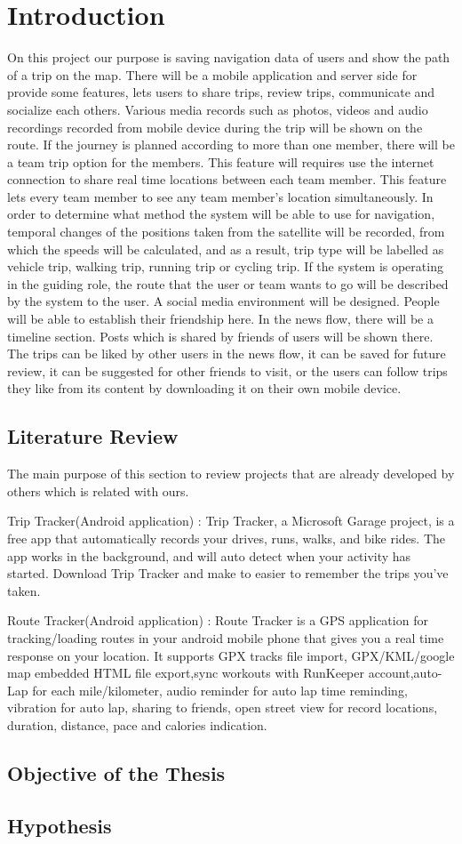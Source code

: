 \chapter{Introduction}
On this project our purpose is saving navigation data of users and show the path of a trip on the map. There will be a mobile application and server side for provide some features, lets users to share trips, review trips, communicate and socialize each others. Various media records such as photos, videos and audio recordings recorded from mobile device during the trip will be shown on the route. If the journey is planned according to more than one member, there will be a team trip option for the members. This feature will requires use the internet connection to share real time locations between each team member. This feature lets every team member to see any team member's location simultaneously. In order to determine what method the system will be able to use for navigation, temporal changes of the positions taken from the satellite will be recorded, from which the speeds will be calculated, and as a result, trip type will be labelled as vehicle trip, walking trip, running trip or cycling trip. If the system is operating in the guiding role, the route that the user or team wants to go will be described by the system to the user. A social media environment will be designed. People will be able to establish their friendship here. In the news flow, there will be a timeline section. Posts which is shared by friends of users will be shown there. The trips can be liked by other users in the news flow, it can be saved for future review, it can be suggested for other friends to visit, or the users can follow trips they like from its content by downloading it on their own mobile device.
\section{Literature Review}
The main purpose of this section to review projects that are already developed by others which is related with ours.

Trip Tracker(Android application) : Trip Tracker, a Microsoft Garage project, is a free app that automatically records your drives, runs, walks, and bike rides. The app works in the background, and will auto detect when your activity has started. Download Trip Tracker and make to easier to remember the trips you’ve taken. 

Route Tracker(Android application) : Route Tracker is a GPS application for tracking/loading routes in your android mobile phone that gives you a real time response on your location. It supports GPX tracks file import, GPX/KML/google map embedded HTML file export,sync workouts with RunKeeper account,auto-Lap for each mile/kilometer, audio reminder for auto lap time reminding, vibration for auto lap, sharing to friends, open street view for record locations, duration, distance, pace and calories indication.






\section{Objective of the Thesis}


\section{Hypothesis}
